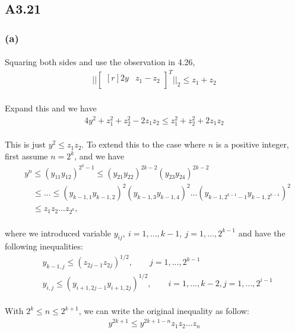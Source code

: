 \subsection*{A3.21}
\subsubsection*{(a)}
\paragraph{}
Squaring both sides and use the observation in 4.26,
\begin{align*}
||\begin{bmatrix*}[r]
2y & z_1-z_2 \\
\end{bmatrix*}^T||_2 \leq z_1 +z_2
\end{align*}
\paragraph{}
Expand this and we have
\begin{align*}
4y^2 +z_1^2 +z^2_2 -2z_1z_2 \leq z_1^2 +z^2_2 +2z_1z_2
\end{align*}
\paragraph{}
This is just $y^2 \leq z_1z_2$. To extend this to the case where $n$ is a positive integer, first assume $n= 2^k$, and we have
\begin{align*}
&y^n \leq (y_{11}y_{12})^{2^k-1}\leq(y_{21}y_{22})^{2k-2}(y_{23}y_{24})^{2k-2} \\
&\quad \leq ...\leq (y_{k-1,1}y_{k-1, 2})^2(y_{k-1,3}y_{k-1, 4})^2...(y_{k-1,2^{k-1}-1}y_{k-1, 2^{k-1}})^2\\
&\quad \leq z_1z_2...z_{2^k},
\end{align*}
\paragraph{}
where we introduced variable $y_{ij},\ i=1,...,k-1, \ j=1,...,2^{k-1} $ and have the following inequalities:
\begin{align*}
&y_{k-1, j} \leq (z_{2j-1}z_{2j})^{1/2}, \qquad j = 1,...,2^{k-1} \\
&y_{i, j} \leq (y_{i+1,2j-1}y_{i+1,2j})^{1/2}, \qquad i= 1,...,k-2, j = 1,...,2^{i-1}
\end{align*}
\paragraph{}
With $ 2^k \leq n \leq 2^{k+1}$, we can write the original inequality as follow:
\begin{align*}
y^{2k+1} \leq y^{2k+1-n}z_1z_2...z_n
\end{align*}
